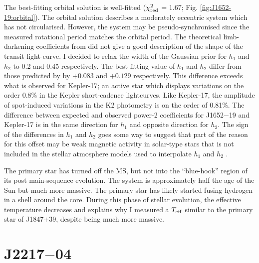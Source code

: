 The best-fitting orbital solution is well-fitted ($\chi^2_{\rm red}$ = 1.67; Fig. \ref{fig:J1652-19:orbital}). The orbital solution describes a moderately eccentric system which has not circularised. However, the system may be pseudo-synchronised since the measured rotational period matches the orbital period. The theoretical limb-darkening coefficients from \citet{2018arXiv180407943M} did not give a good description of the shape of the transit light-curve. I decided to relax the width of the Gaussian prior for $h_1$ and $h_2$ to 0.2 and 0.45 respectively. The best fitting value of $h_1$ and $h_2$ differ from those predicted by \citet{2018arXiv180407943M} by $+0.083$ and $+0.129$ respectively. This difference exceeds what is observed for Kepler-17; an active star which displays variations on the order 0.8\% in the Kepler short-cadence lightcurves. Like Kepler-17, the amplitude of spot-induced variations in the K2 photometry is on the order of 0.81\%. The difference between expected and observed power-2 coefficients for J1652$-$19 and Kepler-17 is in the same direction for $h_1$ and opposite direction for $h_2$. The sign of the differences in $h_1$ and $h_2$ goes some way to suggest that part of the reason for this offset may be weak magnetic activity in solar-type stars that is not included in the stellar atmosphere models used to interpolate $h_1$ and $h_2$  \citet{2018arXiv180407943M}.


The primary star has turned off the MS, but not into the ``blue-hook'' region of its  post main-sequence evolution. The system is approximately half the age of the Sun but much more massive. The primary star has likely started fusing hydrogen in a shell around the core. During this phase of stellar evolution, the effective temperature decreases and explains why I measured a $T_{\rm eff}$ similar to the primary star of J1847$+$39, despite being much more massive.



\section{J2217$-$04}

